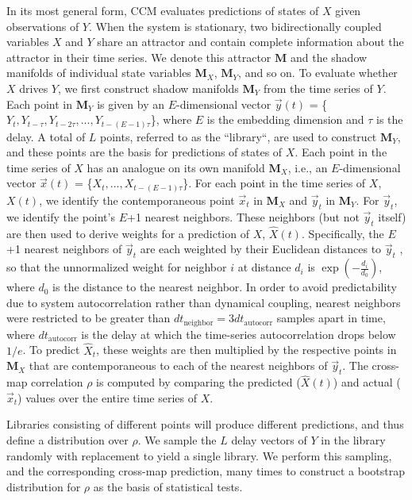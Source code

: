 \documentclass[10pt]{article}
\begin{document}
In its most general form, CCM evaluates predictions of states of $X$ given observations of $Y$. 
When the system is stationary, two bidirectionally coupled variables $X$ and $Y$ share an attractor and contain complete information about the attractor in their time series.
We denote this attractor $\pmb{M}$ and the shadow manifolds of individual state variables $\pmb{M}_X$, $\pmb{M}_Y$, and so on.
To evaluate whether $X$ drives $Y$, we first construct shadow manifolds $\pmb{M}_Y$ from the time series of $Y$. 
Each point in $\pmb{M}_Y$ is given by an $E$-dimensional vector $\vec{y}(t)$ = \{$Y_t, Y_{t-\tau}, Y_{t-2\tau},...,Y_{t-(E-1)\tau}$\}, where $E$ is the embedding dimension and $\tau$ is the delay.
A total of $L$ points, referred to as the ``library``, are used to construct $\pmb{M}_Y$, and these points are the basis for predictions of states of $X$.
Each point in the time series of $X$ has an analogue on its own manifold $\pmb{M}_X$, i.e., an $E$-dimensional vector $\vec{x}(t)$ = \{$X_t,...,X_{t-(E-1)\tau}$\}. 
For each point in the time series of $X$, $X(t)$, we identify the contemporaneous point $\vec{x}_t$ in $\pmb{M}_X$ and $\vec{y}_t$ in $\pmb{M}_Y$.
For $\vec{y}_t$, we identify the point's $E$+1 nearest neighbors.
These neighbors (but not $\vec{y}_t$ itself) are then used to derive weights for a prediction of $X$, $\hat{X}(t)$. 
Specifically, the $E$+1 nearest neighbors of $\vec{y}_t$ are each weighted by their Euclidean distances to $\vec{y}_t$ \cite{Sugihara2012}, so that the unnormalized weight for neighbor $i$ at distance $d_i$ is $\exp\left(-\frac{d_i}{d_0} \right)$, where $d_0$ is the distance to the nearest neighbor.
In order to avoid predictability due to system autocorrelation rather than dynamical coupling, nearest neighbors were restricted to be greater than $dt_{\mathrm{neighbor}} = 3dt_{\mathrm{autocorr}}$ samples apart in time, where $dt_{\mathrm{autocorr}}$ is the delay at which the time-series autocorrelation drops below $1/e$.
To predict $\hat{X}_t$, these weights are then multiplied by the respective points in $\pmb{M}_X$ that are contemporaneous to each of the nearest neighbors of $\vec{y}_t$.
The cross-map correlation $\rho$ is computed by comparing the predicted ($\hat{X}(t)$) and actual ($\vec{x}_t$) values over the entire time series of $X$.

Libraries consisting of different points will produce different predictions, and thus define a distribution over $\rho$. We sample the $L$ delay vectors of $Y$ in the library randomly with replacement to yield a single library. We perform this sampling, and the corresponding cross-map prediction, many times to construct a bootstrap distribution for $\rho$ as the basis of statistical tests.
\end{document}
